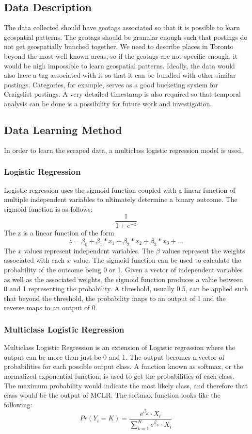 \documentclass[12pt]{article}
\begin{document}
   \subsection{Data Description}
   The data collected should have geotags associated so that it is possible to learn geospatial patterns. The geotags should be granular enough such that postings do not get geospatially bunched together. We need to describe places in Toronto beyond the most well known areas, so if the geotags are not specific enough, it would be nigh impossible to learn geospatial patterns. Ideally, the data would also have a tag associated with it so that it can be bundled with other similar postings. Categories, for example, serves as a good bucketing system for Craigslist postings. A very detailed timestamp is also required so that temporal analysis can be done is a possibility for future work and investigation.

   \subsection{Data Learning Method}
   In order to learn the scraped data, a multiclass logistic regression model is used. 

   \subsubsection{Logistic Regression}
   Logistic regression uses the sigmoid function coupled with a linear function of multiple independent variables to ultimately determine a binary outcome. The sigmoid function is as follows: 
   \[\frac{1}{1+e^{-z}}\]
   The z is a linear function of the form
   \[z = \beta_0 + \beta_1*x_1 + \beta_2*x_2 + \beta_3*x_3  + ...\]
   The \(x\) values represent independent variables. The \(\beta\) values represent the weights associated with each \(x\) value. The sigmoid function can be used to calculate the probability of the outcome being 0 or 1. Given a vector of independent variables as well as the associated weights, the sigmoid function produces a value between 0 and 1 representing the probability. A threshold, usually 0.5, can be applied such that beyond the threshold, the probability maps to an output of 1 and the reverse maps to an output of 0. 

   \subsubsection{Multiclass Logistic Regression}
   Multiclass Logistic Regression is an extension of Logistic regression where the output can be more than just be 0 and 1. The output becomes a vector of probabilities for each possible output class. A function known as softmax, or the normalized exponential function, is used to get the probabilities of each class. The maximum probability would indicate the most likely class, and therefore that class would be the output of MCLR. The softmax function looks like the following: 
   \[Pr(Y_i = K) = \frac{e^{\beta_K} \cdot X_i}{\sum_{k=1}^{K} e^{\beta_K} \cdot X_i}\]
\end{document}
